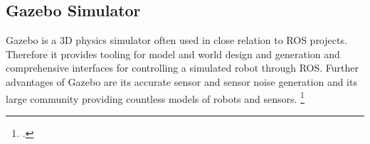 \subsection{Gazebo Simulator}\label{section:gazebo}
Gazebo is a 3D physics simulator often used in close relation to ROS projects. Therefore it provides tooling for model and world design and generation and comprehensive interfaces for controlling a simulated robot through ROS. Further advantages of Gazebo are its accurate sensor and sensor noise generation and its large community providing countless models of robots and sensors. \footcite{openSourceRoboticsFoundationGazeboNodate}

\filbreak